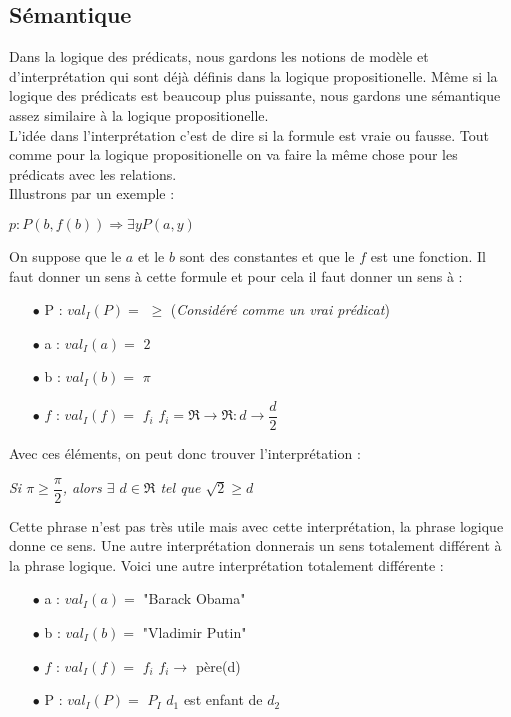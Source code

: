 \subsection{Sémantique}
Dans la logique des prédicats, nous gardons les notions de modèle et d'interprétation qui sont déjà définis dans la logique propositionelle. Même si la logique des prédicats est beaucoup plus puissante, nous gardons une sémantique assez similaire à la logique propositionelle. \\
L'idée dans l'interprétation c'est de dire si la formule est vraie ou fausse. Tout comme pour la logique propositionelle on va faire la même chose pour les prédicats avec les relations.\\

Illustrons par un exemple : 

\begin{center}
$p : P(b,f(b)) \Rightarrow \exists y   P(a,y)$  \\
\vspace{3mm}
\end{center}
On suppose que le $a$ et le $b$ sont des constantes et que le $f$ est une fonction. Il faut donner un sens à cette formule et pour cela il faut donner un sens à : 
\begin{itemize}
\item[$\bullet$]P : $val_{I}(P) = $ $ \geq $ \hspace{3mm} (\textit{Considéré comme un vrai prédicat})
\item[$\bullet$] a : $val_{I}(a) = $ $ 2 $ 
\item[$\bullet$] b : $val_{I}(b) = $ $ \pi $ 
\item[$\bullet$] $f$ : $val_{I}(f) = $ $ f_{i} $ \hspace{3mm} $f_{i}= \Re \rightarrow \Re : d \rightarrow \dfrac{d}{2} $ 
\end{itemize}
Avec ces éléments, on peut donc trouver l'interprétation : 
\begin{center}
\textit{Si $\pi \geq  \dfrac{\pi}{2}$, alors $\exists$ $ d \in \Re$ tel que $\sqrt2 \geq d$ }
\end{center}
Cette phrase n'est pas très utile mais avec cette interprétation, la phrase logique donne ce sens. Une autre interprétation donnerais un sens totalement différent à la phrase logique. Voici une autre interprétation totalement différente :
\begin{itemize}
\item[$\bullet$] a : $val_{I}(a) = $ "Barack Obama"
\item[$\bullet$] b : $val_{I}(b) = $ "Vladimir Putin"
\item[$\bullet$] $f$ : $val_{I}(f) = $ $ f_{i} $ \hspace{3mm} $f_{i} \rightarrow$ père(d) 
\item[$\bullet$] P :  $val_{I}(P) = $ $P_{I}$ \hspace{3mm} $d_{1}$ est enfant de $d_{2}$\\
\end{itemize}

